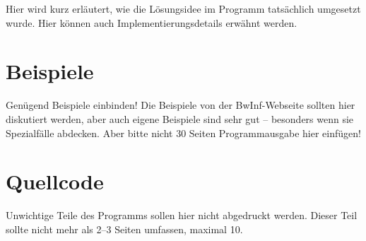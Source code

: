 \documentclass[a4paper,10pt,ngerman]{scrartcl}
\begin{document}
Hier wird kurz erläutert, wie die Lösungsidee im Programm tatsächlich umgesetzt wurde. Hier können auch Implementierungsdetails erwähnt werden.

\section{Beispiele}
Genügend Beispiele einbinden! Die Beispiele von der BwInf-Webseite sollten hier diskutiert werden, aber auch eigene Beispiele sind sehr gut – besonders wenn sie Spezialfälle abdecken. Aber bitte nicht 30 Seiten Programmausgabe hier einfügen!

\section{Quellcode}
Unwichtige Teile des Programms sollen hier nicht abgedruckt werden. Dieser Teil sollte nicht mehr als 2–3 Seiten umfassen, maximal 10.
\end{document}
